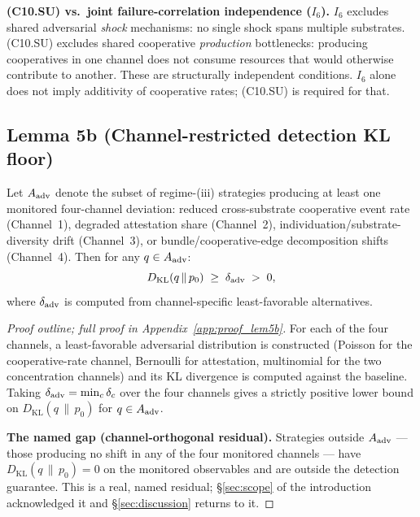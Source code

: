 \textbf{(C10.SU) vs.\ joint failure-correlation independence ($I_6$).}
$I_6$ excludes shared adversarial \emph{shock} mechanisms: no
single shock spans multiple substrates.  (C10.SU) excludes shared
cooperative \emph{production} bottlenecks: producing cooperatives
in one channel does not consume resources that would otherwise
contribute to another.  These are structurally independent
conditions.  $I_6$ alone does not imply additivity of cooperative
rates; (C10.SU) is required for that.

\subsection{Lemma 5b (Channel-restricted detection KL floor)}
\label{sec:lem5b}

\addtocounter{lemma}{-1}\renewcommand{\thelemma}{5b}
\begin{lemma}
\label{lem:5b}
Let $A_{\mathrm{adv}}$ denote the subset of regime-(iii) strategies producing
at least one monitored four-channel deviation: reduced
cross-substrate cooperative event rate (Channel~1), degraded
attestation share (Channel~2), individuation/substrate-diversity
drift (Channel~3), or bundle/cooperative-edge decomposition shifts
(Channel~4). Then for any $q \in A_{\mathrm{adv}}$:
\[
  D_{\mathrm{KL}}(q \,\|\, p_0) \;\geq\; \delta_{\mathrm{adv}} \;>\; 0,
\]
where $\delta_{\mathrm{adv}}$ is computed from channel-specific
least-favorable alternatives.
\end{lemma}

\begin{proof}[Proof outline; full proof in Appendix~\ref{app:proof_lem5b}]
For each of the four channels, a least-favorable adversarial
distribution is constructed (Poisson for the cooperative-rate
channel, Bernoulli for attestation, multinomial for the two
concentration channels) and its KL divergence is computed against
the baseline.  Taking $\delta_{\mathrm{adv}} = \min_c \delta_c$ over the four
channels gives a strictly positive lower bound on
$D_{\mathrm{KL}}(q \,\|\, p_0)$ for $q \in A_{\mathrm{adv}}$.

\textbf{The named gap (channel-orthogonal residual).}  Strategies
outside $A_{\mathrm{adv}}$ --- those producing no shift in any of the four
monitored channels --- have $D_{\mathrm{KL}}(q \,\|\, p_0) = 0$ on
the monitored observables and are outside the detection guarantee.
This is a real, named residual; \S\ref{sec:scope} of the
introduction acknowledged it and \S\ref{sec:discussion} returns to
it.
\end{proof}


